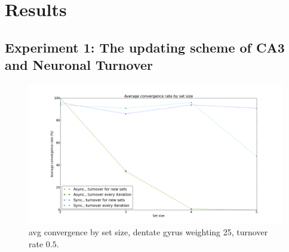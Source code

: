\section{Results}

\subsection{Experiment 1: The updating scheme of CA3 and Neuronal Turnover}






\begin{figure}[h!]
    \centering
    \includegraphics[width=14cm]{fig/avg_convergence_rate.png}
    \caption{avg convergence by set size, dentate gyrus weighting 25, turnover rate $0.5$.}
    \label{fig:avg_convergence_rate}
\end{figure}

